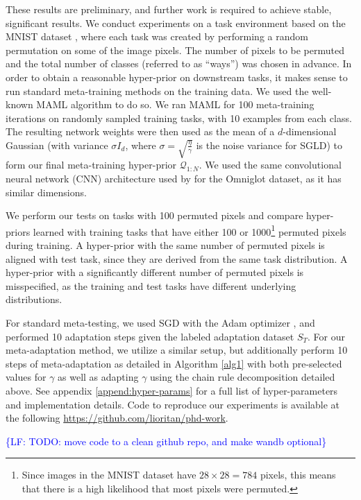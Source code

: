 \documentclass{article}
\theoremstyle{definition}
\newcommand{\LF}[1]{\textcolor{blue}{\{LF: #1\}}}
\begin{document}
These results are preliminary, and further work is required to achieve stable, significant results. We conduct experiments on a task environment based on the MNIST dataset \citep{LeCun1998}, where each task was created by performing a random permutation on some of the image pixels. The number of pixels to be permuted and the total number of classes (referred to as ``ways'') was chosen in advance. In order to obtain a reasonable hyper-prior on downstream tasks, it makes sense to run standard meta-training methods on the training data.
We used the well-known MAML \citep{Finn2017}  algorithm to do so. We ran MAML for 100 meta-training iterations on randomly sampled training tasks, with 10 examples from each class. The resulting network weights were then used as the mean of a $d$-dimensional Gaussian (with variance $\sigma I_d$, where $\sigma=\sqrt{\frac{\eta}{\gamma}}$ is the noise variance for SGLD) to form our final meta-training hyper-prior $\mathcal{Q}_{1:N}$. We used the same convolutional neural network (CNN) architecture used by \citet{Vinyals2016} for the Omniglot dataset, as it has similar dimensions. 

We perform our tests on tasks with 100 permuted pixels and compare hyper-priors learned with training tasks that have either 100 or 1000\footnote{Since images in the MNIST dataset have $28\times 28=784$ pixels, this means that there is a high likelihood that most pixels were permuted.} permuted pixels during training. 
A hyper-prior with the same number of permuted pixels is aligned with test task, since they are derived from the same task distribution. A hyper-prior with a significantly different number of permuted pixels is misspecified, as the training and test tasks have different underlying distributions.

For standard meta-testing, we used SGD with the Adam optimizer \citep{Kingma2015}, and performed 10 adaptation steps given the labeled adaptation dataset $S_T$. For our meta-adaptation method, we utilize a similar setup, but additionally perform 10 steps of meta-adaptation as detailed in Algorithm \ref{alg1} with both pre-selected values for $\gamma$ as well as adapting $\gamma$ using the chain rule decomposition detailed above. See appendix \ref{append:hyper-params} for a full list of hyper-parameters and implementation details. Code to reproduce our experiments is available at the following \hyperlink{Github repository}{https://github.com/lioritan/phd-work}.

\LF{TODO: move code to a clean github repo, and make wandb optional}
\end{document}
